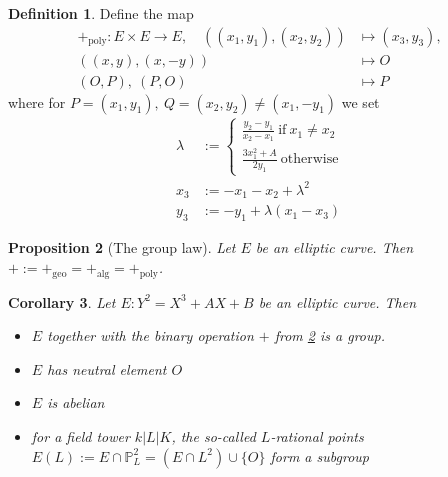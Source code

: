 \documentclass{scrartcl}
\renewcommand{\O}{O}
\newtheorem{prop}{Proposition}[section]
\newtheorem{corollary}[prop]{Corollary}
\theoremstyle{definition}
\newtheorem{definition}[prop]{Definition}
\begin{document}
\begin{definition}
    Define the map 
    \begin{align*}
        +_{\mathrm{poly}}: E \times E \to E, \quad ((x_1, y_1), (x_2, y_2)) &\mapsto (x_3, y_3), \\
        ((x, y), (x, -y)) &\mapsto \O \\
        (\O, P), \ (P, \O) &\mapsto P
    \end{align*}
    where for $P = (x_1, y_1), \ Q = (x_2, y_2) \neq (x_1, -y_1)$ we set
    \begin{align*}
        \lambda &:= \begin{cases}
            \frac {y_2 - y_1} {x_2 - x_1} \ \text{if} \ x_1 \neq x_2 \\
            \frac {3 x_1^2 + A} {2 y_1} \ \text{otherwise}
        \end{cases} \\
        x_3 &:= -x_1 - x_2 + \lambda^2 \\
        y_3 &:= -y_1 + \lambda (x_1 - x_3)
    \end{align*}
\end{definition}

\begin{prop}[The group law]
    \label{prop:group_operation}
    Let $E$ be an elliptic curve. Then $+ := +_{\mathrm{geo}} = +_{\mathrm{alg}} = +_{\mathrm{poly}}$.
\end{prop}

\begin{corollary}
    Let $E: Y^2 = X^3 + AX + B$ be an elliptic curve. Then 
    \begin{itemize}
        \item $E$ together with the binary operation $+$ from \ref{prop:group_operation} is a group.
        \item $E$ has neutral element $\O$
        \item $E$ is abelian
        \item for a field tower $k|L|K$, the so-called $L$-rational points $E(L) := E \cap \mathbb{P}_L^2 = (E \cap L^2) \cup \{ \O \}$ form a subgroup
    \end{itemize}
\end{corollary}
\end{document}
